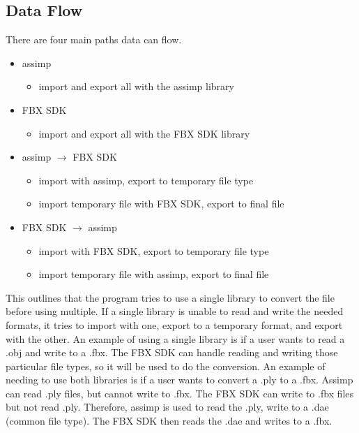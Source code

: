     \subsection{Data Flow}
        There are four main paths data can flow.
        \begin{itemize}
            \item assimp
            \begin{itemize}
                \item import and export all with the assimp library
            \end{itemize}
            
            \item FBX SDK
            \begin{itemize}
                \item import and export all with the FBX SDK library
            \end{itemize}

            \item assimp $\rightarrow$ FBX SDK
            \begin{itemize}
                \item import with assimp, export to temporary file type
                \item import temporary file with FBX SDK, export to final file 
            \end{itemize}

            \item FBX SDK $\rightarrow$ assimp
            \begin{itemize}
                \item import with FBX SDK, export to temporary file type
                \item import temporary file with assimp, export to final file 
            \end{itemize}
        \end{itemize}
        
        This outlines that the program tries to use a single library to convert the file before using multiple.  If a single library is unable to 
        read and write the needed formats, it tries to import with one, export to a temporary format, and export with the other.  An example of 
        using a single library is if a user wants to read a .obj and write to a .fbx.  The FBX SDK can handle reading and writing those particular file
        types, so it will be used to do the conversion.  An example of needing to use both libraries is if a user wants to convert a .ply to a .fbx.
        Assimp can read .ply files, but cannot write to .fbx.  The FBX SDK can write to .fbx files but not read .ply.  Therefore, assimp is used to 
        read the .ply, write to a .dae (common file type).  The FBX SDK then reads the .dae and writes to a .fbx.

